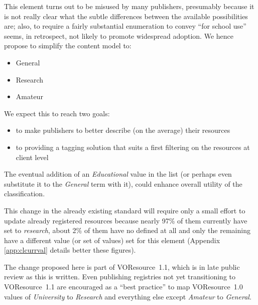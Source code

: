 \documentclass{ivoa}
\begin{document}
This element turns out to be misused by many publishers, presumably because
it is not really clear what the subtle differences between the available
possibilities are; also, to require a fairly substantial enumeration to
convey ``for school use'' seems, in retrospect, not likely to promote
widespread adoption. We hence propose to simplify the content model
to:


\begin{itemize}

\item General{}

\item Research{}

\item Amateur{}

\end{itemize}

We expect this to reach two goals:
  
\begin{itemize}

\item to make publishers to better describe (on the average)
    their resources{}

\item to providing a tagging solution that suits a first filtering 
    on the resources at client level{}

\end{itemize}

The eventual
addition of an 
\emph{Educational}
value in the list (or perhaps even
substitute it to the 
\emph{General} term with it),
could enhance overall utility of the classification.
  


This change in the already existing standard will require only 
a small effort to update already registered resources because nearly 97\% of 
them currently have  set to 
\emph{research}, about 2\% of them have
no  defined at all and only the remaining have a different value
(or set of values) set for this element (Appendix \ref{app:clcurrval} details better these
figures).
  

The change proposed here is part of VOResource~1.1, which is in late
public review as this is written.  Even publishing registries not yet
transitioning to VOResource~1.1 are encouraged as
a ``best practice'' to map VOResource~1.0
 values 
  of 
\emph{University}
 to 
\emph{Research}
 and
  everything else except 
\emph{Amateur}
 to 
\emph{General}.
\end{document}
